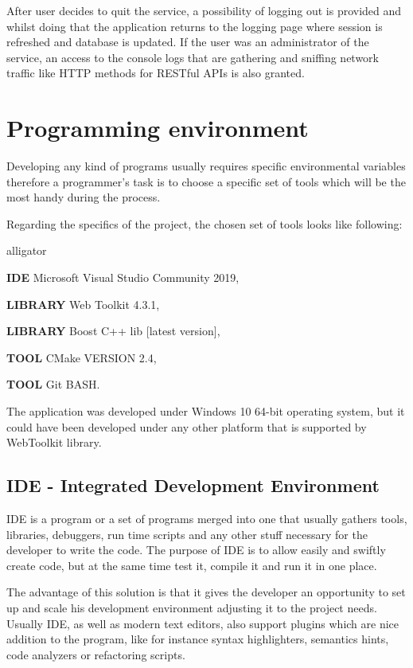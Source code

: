 \documentclass[a4paper,12pt]{book}
\newcommand\tab[1][1cm]{\hspace*{#1}}
\begin{document}
{\bigskip
After user decides to quit the service, a possibility of logging out is provided and whilst doing that the application returns to the logging page where session is refreshed and database is updated. If the user was an administrator of the service, an access to the console logs that are gathering and sniffing network traffic like HTTP methods for RESTful APIs is also granted.  

\section{Programming environment}
{\tab Developing any kind of programs usually requires specific environmental variables therefore a programmer's task is to choose a specific set of tools which will be the most handy during the process.  

\bigskip
Regarding the specifics of the project, the chosen set of tools looks like following:
\begin{labeling}{alligator}
\item [\textbf{IDE}] Microsoft Visual Studio Community 2019,
\item [\textbf{LIBRARY}] Web Toolkit 4.3.1,
\item [\textbf{LIBRARY}] Boost C++ lib [latest version],
\item [\textbf{TOOL}] CMake VERSION 2.4,
\item [\textbf{TOOL}] Git BASH.
\end{labeling}}

The application was developed under Windows 10 64-bit operating system, but it could have been developed under any other platform that is supported by WebToolkit library.

\newpage
\subsection*{IDE - Integrated Development Environment}
{
\tab IDE is a program or a set of programs merged into one that usually gathers tools, libraries, debuggers, run time scripts and any other stuff necessary for the developer to write the code. The purpose of IDE is to allow easily and swiftly create code, but at the same time test it, compile it and run it in one place. 

\bigskip
The advantage of this solution is that it gives the developer an opportunity to set up and scale his development environment adjusting it to the project needs. Usually IDE, as well as modern text editors, also support plugins which are nice addition to the program, like for instance syntax highlighters, semantics hints, code analyzers or refactoring scripts.

}}
\end{document}
